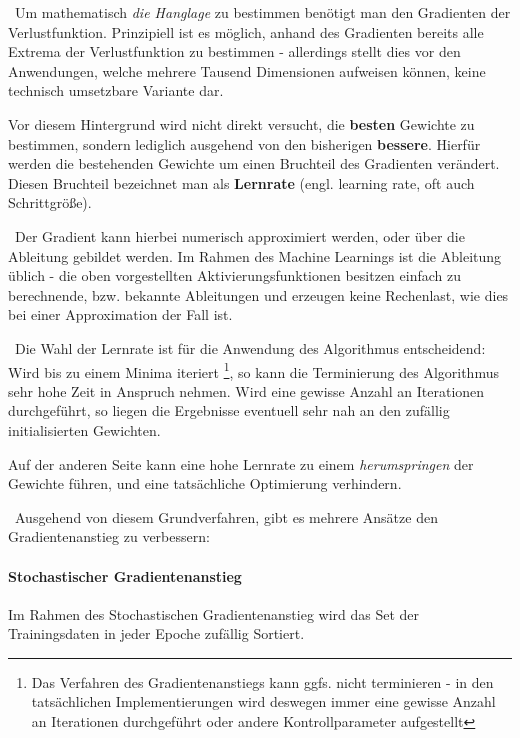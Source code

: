 ~\newline Um mathematisch \textit{die Hanglage} zu bestimmen benötigt man den Gradienten der Verlustfunktion. Prinzipiell ist es möglich, anhand des Gradienten bereits alle Extrema der Verlustfunktion zu bestimmen - allerdings stellt dies vor den Anwendungen, welche mehrere Tausend Dimensionen aufweisen können, keine technisch umsetzbare Variante dar. 

Vor diesem Hintergrund wird nicht direkt versucht, die \textbf{besten} Gewichte zu bestimmen, sondern lediglich ausgehend von den bisherigen \textbf{bessere}. Hierfür werden die bestehenden Gewichte um einen Bruchteil des Gradienten verändert. Diesen Bruchteil bezeichnet man als \textbf{Lernrate} (engl. learning rate, oft auch Schrittgröße).

~\newline Der Gradient kann hierbei numerisch approximiert werden, oder über die Ableitung gebildet werden. Im Rahmen des Machine Learnings ist die Ableitung üblich - die oben vorgestellten Aktivierungsfunktionen besitzen einfach zu berechnende, bzw. bekannte Ableitungen und erzeugen keine Rechenlast, wie dies bei einer Approximation der Fall ist.

~\newline Die Wahl der Lernrate ist für die Anwendung des Algorithmus entscheidend: Wird bis zu einem Minima iteriert \footnote{Das Verfahren des Gradientenanstiegs kann ggfs. nicht terminieren - in den tatsächlichen Implementierungen wird deswegen immer eine gewisse Anzahl an Iterationen durchgeführt oder andere Kontrollparameter aufgestellt}, so kann die Terminierung des Algorithmus sehr hohe Zeit in Anspruch nehmen. Wird eine gewisse Anzahl an Iterationen durchgeführt, so liegen die Ergebnisse eventuell sehr nah an den zufällig initialisierten Gewichten.

Auf der anderen Seite kann eine hohe Lernrate zu einem \textit{herumspringen} der Gewichte führen, und eine tatsächliche Optimierung verhindern.

~\newline Ausgehend von diesem Grundverfahren, gibt es mehrere Ansätze den Gradientenanstieg zu verbessern:

\paragraph{Stochastischer Gradientenanstieg}
Im Rahmen des Stochastischen Gradientenanstieg wird das Set der Trainingsdaten in jeder Epoche zufällig Sortiert. 

